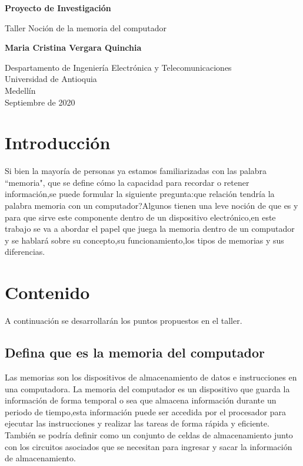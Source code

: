 \documentclass{article}
\begin{document}
\begin{titlepage}
    \begin{center}
        \vspace*{1cm}
            
        \Huge
        \textbf{Proyecto de Investigación}
            
        \vspace{0.5cm}
        \LARGE
        Taller Noción de la memoria del computador
            
        \vspace{1.5cm}
            
        \textbf{Maria Cristina Vergara Quinchia}
            
        \vfill
            
        \vspace{0.8cm}
            
        \Large
        Despartamento de Ingeniería Electrónica y Telecomunicaciones\\
        Universidad de Antioquia\\
        Medellín\\
        Septiembre de 2020
            
    \end{center}
\end{titlepage}

\tableofcontents
\newpage
\section{Introducción}\label{intro}
Si bien la mayoría de personas ya estamos familiarizadas con las palabra  “memoria", que se  define cómo la capacidad para recordar o retener información,se puede formular la siguiente pregunta:que relación tendría la palabra memoria con un computador?Algunos tienen una leve noción de que es y para que sirve este componente dentro de un dispositivo electrónico,en este trabajo se va a abordar el papel que juega la memoria dentro de un computador y se hablará sobre su concepto,su funcionamiento,los tipos de memorias y sus diferencias.
\section{Contenido}\label{contenido}
A continuación se desarrollarán los puntos propuestos en el taller.

\subsection{Defina que es la memoria del computador}
Las memorias son los dispositivos de almacenamiento de datos e instrucciones en una computadora.\cite{UNT}
La memoria del computador es un dispositivo que guarda la información de forma temporal o sea que almacena información durante un periodo de tiempo,esta información puede ser accedida  por el procesador para ejecutar las instrucciones y realizar las tareas de forma rápida y eficiente.
También se podría definir como un conjunto de celdas de almacenamiento junto con los circuitos asociados que se necesitan para ingresar y sacar la información de almacenamiento.\cite{FIng}
\end{document}

